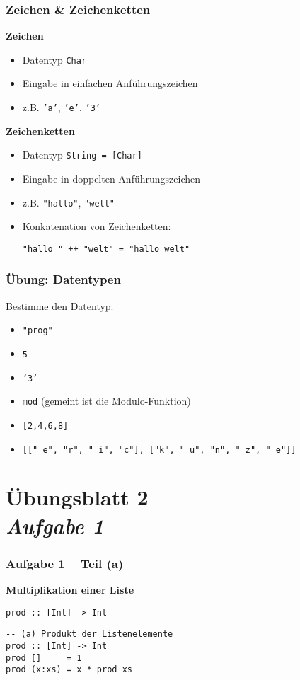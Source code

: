 \documentclass{beamer}
\begin{document}
	\begin{frame}[fragile] \frametitle{Zeichen \& Zeichenketten}
		\textbf{Zeichen}
		\begin{itemize}
			\item Datentyp \texttt{Char}
			\item Eingabe in einfachen Anführungszeichen
			\item z.B. \texttt{'a'}, \texttt{'e'}, \texttt{'3'}
		\end{itemize}
		\pause
		\textbf{Zeichenketten}
		\begin{itemize}
			\item Datentyp \texttt{String = [Char]}
			\item Eingabe in doppelten Anführungszeichen
			\item z.B. \texttt{"hallo"}, \texttt{"welt"}
			\item Konkatenation von Zeichenketten: 
			\begin{lstlisting}[basicstyle=\ttfamily, numbers=none, frame=none, showstringspaces=false]
"hallo " ++ "welt" = "hallo welt"
			\end{lstlisting}
		\end{itemize}
	\end{frame}

	\begin{frame} \frametitle{Übung: Datentypen}
		Bestimme den Datentyp:
		\begin{itemize}
			\item \texttt{"prog"}
			\item \texttt{5}
			\item \texttt{'3'}
			\item \texttt{mod} (gemeint ist die Modulo-Funktion)
			\item \texttt{[2,4,6,8]}
			\item \texttt{[[" \!\!\! e", "r", "\!\!\! i", "c"], ["k", "\!\!\! u", "n", " \!\!\! z", "\!\!\! e"]]}
		\end{itemize}
	\end{frame}


\section{Übungsblatt 2 \\ \textit{\normalsize Aufgabe 1}}

\begin{frame}[t, fragile] \frametitle{Aufgabe 1 -- Teil (a)}
	\textbf{Multiplikation einer Liste}
	
	\texttt{prod :: [Int] -> Int}
	
	\pause \bigskip
	
	\begin{lstlisting}
-- (a) Produkt der Listenelemente
prod :: [Int] -> Int
prod []     = 1
prod (x:xs) = x * prod xs
	\end{lstlisting}
\end{frame}
\end{document}
